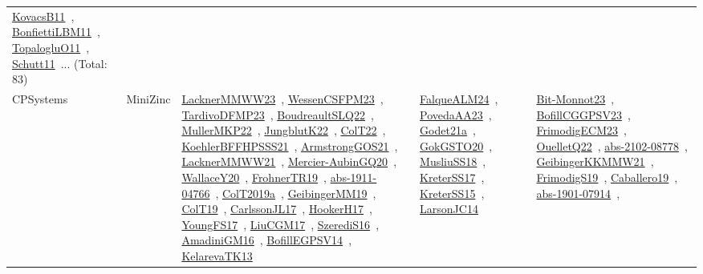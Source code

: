 {\begin{longtable}{lp{3cm}>{\raggedright\arraybackslash}p{6cm}>{\raggedright\arraybackslash}p{6cm}>{\raggedright\arraybackslash}p{8cm}}
\href{../works/KovacsB11.pdf}{KovacsB11}~\cite{KovacsB11}, \href{../works/BonfiettiLBM11.pdf}{BonfiettiLBM11}~\cite{BonfiettiLBM11}, \href{../works/TopalogluO11.pdf}{TopalogluO11}~\cite{TopalogluO11}, \href{../works/Schutt11.pdf}{Schutt11}~\cite{Schutt11}... (Total: 83)\\
\index{MiniZinc}\index{CPSystems!MiniZinc}CPSystems & MiniZinc & \href{../works/LacknerMMWW23.pdf}{LacknerMMWW23}~\cite{LacknerMMWW23}, \href{../works/WessenCSFPM23.pdf}{WessenCSFPM23}~\cite{WessenCSFPM23}, \href{../works/TardivoDFMP23.pdf}{TardivoDFMP23}~\cite{TardivoDFMP23}, \href{../works/BoudreaultSLQ22.pdf}{BoudreaultSLQ22}~\cite{BoudreaultSLQ22}, \href{../works/MullerMKP22.pdf}{MullerMKP22}~\cite{MullerMKP22}, \href{../works/JungblutK22.pdf}{JungblutK22}~\cite{JungblutK22}, \href{../works/ColT22.pdf}{ColT22}~\cite{ColT22}, \href{../works/KoehlerBFFHPSSS21.pdf}{KoehlerBFFHPSSS21}~\cite{KoehlerBFFHPSSS21}, \href{../works/ArmstrongGOS21.pdf}{ArmstrongGOS21}~\cite{ArmstrongGOS21}, \href{../works/LacknerMMWW21.pdf}{LacknerMMWW21}~\cite{LacknerMMWW21}, \href{../works/Mercier-AubinGQ20.pdf}{Mercier-AubinGQ20}~\cite{Mercier-AubinGQ20}, \href{../works/WallaceY20.pdf}{WallaceY20}~\cite{WallaceY20}, \href{../works/FrohnerTR19.pdf}{FrohnerTR19}~\cite{FrohnerTR19}, \href{../works/abs-1911-04766.pdf}{abs-1911-04766}~\cite{abs-1911-04766}, \href{../works/ColT2019a.pdf}{ColT2019a}~\cite{ColT2019a}, \href{../works/GeibingerMM19.pdf}{GeibingerMM19}~\cite{GeibingerMM19}, \href{../works/ColT19.pdf}{ColT19}~\cite{ColT19}, \href{../works/CarlssonJL17.pdf}{CarlssonJL17}~\cite{CarlssonJL17}, \href{../works/HookerH17.pdf}{HookerH17}~\cite{HookerH17}, \href{../works/YoungFS17.pdf}{YoungFS17}~\cite{YoungFS17}, \href{../works/LiuCGM17.pdf}{LiuCGM17}~\cite{LiuCGM17}, \href{../works/SzerediS16.pdf}{SzerediS16}~\cite{SzerediS16}, \href{../works/AmadiniGM16.pdf}{AmadiniGM16}~\cite{AmadiniGM16}, \href{../works/BofillEGPSV14.pdf}{BofillEGPSV14}~\cite{BofillEGPSV14}, \href{../works/KelarevaTK13.pdf}{KelarevaTK13}~\cite{KelarevaTK13} & \href{../works/FalqueALM24.pdf}{FalqueALM24}~\cite{FalqueALM24}, \href{../works/PovedaAA23.pdf}{PovedaAA23}~\cite{PovedaAA23}, \href{../works/Godet21a.pdf}{Godet21a}~\cite{Godet21a}, \href{../works/GokGSTO20.pdf}{GokGSTO20}~\cite{GokGSTO20}, \href{../works/MusliuSS18.pdf}{MusliuSS18}~\cite{MusliuSS18}, \href{../works/KreterSS17.pdf}{KreterSS17}~\cite{KreterSS17}, \href{../works/KreterSS15.pdf}{KreterSS15}~\cite{KreterSS15}, \href{../works/LarsonJC14.pdf}{LarsonJC14}~\cite{LarsonJC14} & \href{../works/Bit-Monnot23.pdf}{Bit-Monnot23}~\cite{Bit-Monnot23}, \href{../works/BofillCGGPSV23.pdf}{BofillCGGPSV23}~\cite{BofillCGGPSV23}, \href{../works/FrimodigECM23.pdf}{FrimodigECM23}~\cite{FrimodigECM23}, \href{../works/OuelletQ22.pdf}{OuelletQ22}~\cite{OuelletQ22}, \href{../works/abs-2102-08778.pdf}{abs-2102-08778}~\cite{abs-2102-08778}, \href{../works/GeibingerKKMMW21.pdf}{GeibingerKKMMW21}~\cite{GeibingerKKMMW21}, \href{../works/FrimodigS19.pdf}{FrimodigS19}~\cite{FrimodigS19}, \href{../works/Caballero19.pdf}{Caballero19}~\cite{Caballero19}, \href{../works/abs-1901-07914.pdf}{abs-1901-07914}~\cite{abs-1901-07914}, 
\end{longtable}}
